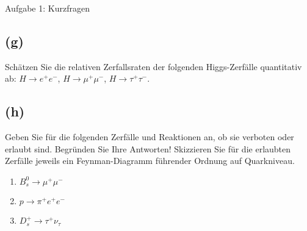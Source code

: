 \begin{aufgabe}{Aufgabe 1: Kurzfragen}
\subsection{(g)}
Schätzen Sie die relativen Zerfallsraten der folgenden Higgs-Zerfälle quantitativ ab:
$H \to e^+ e^−$,
$H \to \mu^+ \mu^-$,
$H \to \tau^+ \tau^−$.

\subsection{(h)}
Geben Sie für die folgenden Zerfälle und Reaktionen an, ob sie verboten oder erlaubt
sind. Begründen Sie Ihre Antworten! Skizzieren Sie für die erlaubten Zerfälle jeweils ein
Feynman-Diagramm führender Ordnung auf Quarkniveau.
\begin{enumerate}
    \item $B_s^0 \to \mu^+ \mu^-$
    \item $p \to \pi^+ e^+ e^−$
    \item $D_s^+ \to \tau^+ \nu_\tau$
\end{enumerate}
\end{aufgabe}

